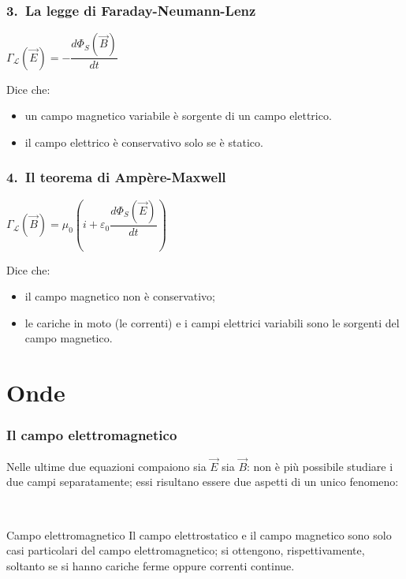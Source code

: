 \documentclass[]{beamer}
\theoremstyle{plain}
\begin{document}
\begin{frame}
  \frametitle{3.~La legge di Faraday-Neumann-Lenz}
  \begin{center}
\colorbox{marroncino!30}{  $ \Gamma_\mathscr{L} (\vec{E}) = -\dfrac{d\Phi_S(\vec{B})}{dt} $}
  \end{center}\pause
  Dice che:
  \begin{itemize}
    \item un campo magnetico variabile è sorgente di un campo elettrico.\pause
    \item il campo elettrico è conservativo solo se è statico.
  \end{itemize}
\end{frame}

\begin{frame}
  \frametitle{4.~Il teorema di Ampère-Maxwell}
  \begin{center}
\colorbox{marroncino!30}{$ \Gamma_\mathscr{L} (\vec{B}) = \mu_0 \left( i + \varepsilon_0 \dfrac{d\Phi_S(\vec{E})}{dt} \right) $}
  \end{center}\pause
  Dice che:
  \begin{itemize}
    \item il campo magnetico non è conservativo;\pause
    \item le cariche in moto (le correnti) e i campi elettrici variabili sono le sorgenti del campo magnetico.
  \end{itemize}
\end{frame}


\section{Onde}

\begin{frame}
  \frametitle{Il campo elettromagnetico}
Nelle ultime due equazioni \alert<1>{compaiono sia $ \vec{E} $ sia $ \vec{B} $}:{\pause} non è più possibile studiare i due campi separatamente; essi risultano essere \alert<2>{due aspetti di un unico fenomeno}:\pause

~

\begin{block}{Campo elettromagnetico}
Il campo elettrostatico e il campo magnetico sono solo casi particolari del campo elettromagnetico; si ottengono, rispettivamente, soltanto se si hanno cariche ferme oppure correnti continue.
\end{block}
\end{frame}
\end{document}
